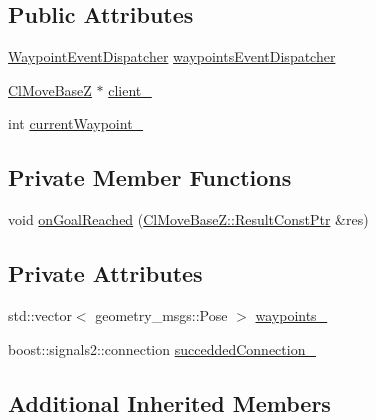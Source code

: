 \subsection*{Public Attributes}
\begin{DoxyCompactItemize}
\item 
\hyperlink{classmove__base__z__client_1_1WaypointEventDispatcher}{Waypoint\+Event\+Dispatcher} \hyperlink{classmove__base__z__client_1_1WaypointNavigator_a488a89db6cd20bc12548ac454254829f}{waypoints\+Event\+Dispatcher}
\item 
\hyperlink{classmove__base__z__client_1_1ClMoveBaseZ}{Cl\+Move\+BaseZ} $\ast$ \hyperlink{classmove__base__z__client_1_1WaypointNavigator_aadb289ffdaeda3a751fe569a2ee84c48}{client\+\_\+}
\item 
int \hyperlink{classmove__base__z__client_1_1WaypointNavigator_a7da763128724f7b08c32c79cb3a88934}{current\+Waypoint\+\_\+}
\end{DoxyCompactItemize}
\subsection*{Private Member Functions}
\begin{DoxyCompactItemize}
\item 
void \hyperlink{classmove__base__z__client_1_1WaypointNavigator_ae4c5a879ff016f197c1cec54b2adaa1b}{on\+Goal\+Reached} (\hyperlink{classmove__base__z__client_1_1ClMoveBaseZ_a3b774d99d3dd4526f99b968d65ef5834}{Cl\+Move\+Base\+Z\+::\+Result\+Const\+Ptr} \&res)
\end{DoxyCompactItemize}
\subsection*{Private Attributes}
\begin{DoxyCompactItemize}
\item 
std\+::vector$<$ geometry\+\_\+msgs\+::\+Pose $>$ \hyperlink{classmove__base__z__client_1_1WaypointNavigator_a83e4e39987eaf1c8856d32d581eb4cd0}{waypoints\+\_\+}
\item 
boost\+::signals2\+::connection \hyperlink{classmove__base__z__client_1_1WaypointNavigator_a139d492345875777d9c9a79f9b2d494b}{succedded\+Connection\+\_\+}
\end{DoxyCompactItemize}
\subsection*{Additional Inherited Members}


